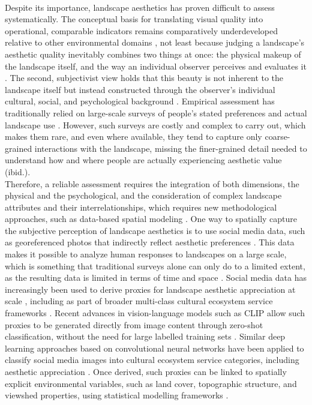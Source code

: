 \documentclass[hidelinks, 11pt]{article}
\begin{document}
\\
Despite its importance, landscape aesthetics has proven difficult to assess systematically. The conceptual basis for translating visual quality into operational, comparable indicators remains comparatively underdeveloped relative to other environmental domains \citep{tveit_key_2006}, not least because judging a landscape's aesthetic quality inevitably combines two things at once: the physical makeup of the landscape itself, and the way an individual observer perceives and evaluates it \citep{daniel_whither_2001,zhang_assessment_2022,schirpke_predicting_2013}. The second, subjectivist view holds that this beauty is not inherent to the landscape itself but instead constructed through the observer's individual cultural, social, and psychological background \citep{lothian_landscape_1999}. Empirical assessment has traditionally relied on large-scale surveys of people's stated preferences and actual landscape use \citep{havinga_social_2021}. However, such surveys are costly and complex to carry out, which makes them rare, and even where available, they tend to capture only coarse-grained interactions with the landscape, missing the finer-grained detail needed to understand how and where people are actually experiencing aesthetic value (ibid.).
\\
Therefore, a reliable assessment requires the integration of both dimensions, the physical and the psychological, and the consideration of complex landscape attributes and their interrelationships, which requires new methodological approaches, such as data-based spatial modeling \citep{de_la_fuente_de_val_relationship_2006,sahraoui_spatial_2016}. One way to spatially capture the subjective perception of landscape aesthetics is to use social media data, such as georeferenced photos that indirectly reflect aesthetic preferences \citep{comalada_modelling_2025,langemeyer_mapping_2018,tieskens_aesthetic_2018,liao_mapping_2025}.  This data makes it possible to analyze human responses to landscapes on a large scale, which is something that traditional surveys alone can only do to a limited extent, as the resulting data is limited in terms of time and space \citep{cardoso_classifying_2022,yoshimura_demand_2017}. Social media data has increasingly been used to derive proxies for landscape aesthetic appreciation at scale \citep{havinga_social_2021, gosal_landscape_2020,despotovic_beautiful_2025}, including as part of broader multi-class cultural ecosystem service frameworks \citep{liao_mapping_2025}. Recent advances in vision-language models such as CLIP allow such proxies to be generated directly from image content through zero-shot classification, without the need for large labelled training sets \citep{liao_mapping_2025,radford_learning_2021}. Similar deep learning approaches based on convolutional neural networks have been applied to classify social media images into cultural ecosystem service categories, including aesthetic appreciation \citep{cardoso_classifying_2022}. Once derived, such proxies can be linked to spatially explicit environmental variables, such as land cover, topographic structure, and viewshed properties, using statistical modelling frameworks \citep{schirpke_predicting_2013, vaz_digital_2020}. 
\end{document}
